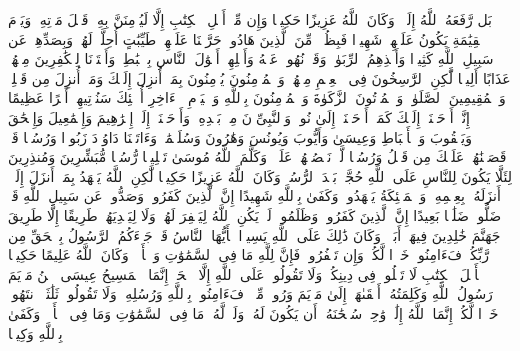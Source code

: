 \startbuffer[\q:4:158]
بَل رَّفَعَهُ ٱللَّهُ إِلَیۡهِۚ وَكَانَ ٱللَّهُ عَزِیزًا حَكِیمࣰا%
\stopbuffer
\startbuffer[\q:4:159]
وَإِن مِّنۡ أَهۡلِ ٱلۡكِتَٰبِ إِلَّا لَیُؤۡمِنَنَّ بِهِۦ قَبۡلَ مَوۡتِهِۦۖ وَیَوۡمَ ٱلۡقِیَٰمَةِ یَكُونُ عَلَیۡهِمۡ شَهِیدࣰا%
\stopbuffer
\startbuffer[\q:4:160]
فَبِظُلۡمࣲ مِّنَ ٱلَّذِینَ هَادُوا۟ حَرَّمۡنَا عَلَیۡهِمۡ طَیِّبَٰتٍ أُحِلَّتۡ لَهُمۡ وَبِصَدِّهِمۡ عَن سَبِیلِ ٱللَّهِ كَثِیرࣰا%
\stopbuffer
\startbuffer[\q:4:161]
وَأَخۡذِهِمُ ٱلرِّبَوٰا۟ وَقَدۡ نُهُوا۟ عَنۡهُ وَأَكۡلِهِمۡ أَمۡوَٰلَ ٱلنَّاسِ بِٱلۡبَٰطِلِۚ وَأَعۡتَدۡنَا لِلۡكَٰفِرِینَ مِنۡهُمۡ عَذَابًا أَلِیمࣰا%
\stopbuffer
\startbuffer[\q:4:162]
لَّٰكِنِ ٱلرَّٰسِخُونَ فِی ٱلۡعِلۡمِ مِنۡهُمۡ وَٱلۡمُؤۡمِنُونَ یُؤۡمِنُونَ بِمَاۤ أُنزِلَ إِلَیۡكَ وَمَاۤ أُنزِلَ مِن قَبۡلِكَۚ وَٱلۡمُقِیمِینَ ٱلصَّلَوٰةَۚ وَٱلۡمُؤۡتُونَ ٱلزَّكَوٰةَ وَٱلۡمُؤۡمِنُونَ بِٱللَّهِ وَٱلۡیَوۡمِ ٱلۡءَاخِرِ أُو۟لَٰۤئِكَ سَنُؤۡتِیهِمۡ أَجۡرًا عَظِیمًا%
\stopbuffer
\startbuffer[\q:4:163]
۞ إِنَّاۤ أَوۡحَیۡنَاۤ إِلَیۡكَ كَمَاۤ أَوۡحَیۡنَاۤ إِلَىٰ نُوحࣲ وَٱلنَّبِیِّۦنَ مِنۢ بَعۡدِهِۦۚ وَأَوۡحَیۡنَاۤ إِلَىٰۤ إِبۡرَٰهِیمَ وَإِسۡمَٰعِیلَ وَإِسۡحَٰقَ وَیَعۡقُوبَ وَٱلۡأَسۡبَاطِ وَعِیسَىٰ وَأَیُّوبَ وَیُونُسَ وَهَٰرُونَ وَسُلَیۡمَٰنَۚ وَءَاتَیۡنَا دَاوُۥدَ زَبُورࣰا%
\stopbuffer
\startbuffer[\q:4:164]
وَرُسُلࣰا قَدۡ قَصَصۡنَٰهُمۡ عَلَیۡكَ مِن قَبۡلُ وَرُسُلࣰا لَّمۡ نَقۡصُصۡهُمۡ عَلَیۡكَۚ وَكَلَّمَ ٱللَّهُ مُوسَىٰ تَكۡلِیمࣰا%
\stopbuffer
\startbuffer[\q:4:165]
رُّسُلࣰا مُّبَشِّرِینَ وَمُنذِرِینَ لِئَلَّا یَكُونَ لِلنَّاسِ عَلَى ٱللَّهِ حُجَّةُۢ بَعۡدَ ٱلرُّسُلِۚ وَكَانَ ٱللَّهُ عَزِیزًا حَكِیمࣰا%
\stopbuffer
\startbuffer[\q:4:166]
لَّٰكِنِ ٱللَّهُ یَشۡهَدُ بِمَاۤ أَنزَلَ إِلَیۡكَۖ أَنزَلَهُۥ بِعِلۡمِهِۦۖ وَٱلۡمَلَٰۤئِكَةُ یَشۡهَدُونَۚ وَكَفَىٰ بِٱللَّهِ شَهِیدًا%
\stopbuffer
\startbuffer[\q:4:167]
إِنَّ ٱلَّذِینَ كَفَرُوا۟ وَصَدُّوا۟ عَن سَبِیلِ ٱللَّهِ قَدۡ ضَلُّوا۟ ضَلَٰلَۢا بَعِیدًا%
\stopbuffer
\startbuffer[\q:4:168]
إِنَّ ٱلَّذِینَ كَفَرُوا۟ وَظَلَمُوا۟ لَمۡ یَكُنِ ٱللَّهُ لِیَغۡفِرَ لَهُمۡ وَلَا لِیَهۡدِیَهُمۡ طَرِیقًا%
\stopbuffer
\startbuffer[\q:4:169]
إِلَّا طَرِیقَ جَهَنَّمَ خَٰلِدِینَ فِیهَاۤ أَبَدࣰاۚ وَكَانَ ذَٰلِكَ عَلَى ٱللَّهِ یَسِیرࣰا%
\stopbuffer
\startbuffer[\q:4:170]
یَٰۤأَیُّهَا ٱلنَّاسُ قَدۡ جَاۤءَكُمُ ٱلرَّسُولُ بِٱلۡحَقِّ مِن رَّبِّكُمۡ فَءَامِنُوا۟ خَیۡرࣰا لَّكُمۡۚ وَإِن تَكۡفُرُوا۟ فَإِنَّ لِلَّهِ مَا فِی ٱلسَّمَٰوَٰتِ وَٱلۡأَرۡضِۚ وَكَانَ ٱللَّهُ عَلِیمًا حَكِیمࣰا%
\stopbuffer
\startbuffer[\q:4:171]
یَٰۤأَهۡلَ ٱلۡكِتَٰبِ لَا تَغۡلُوا۟ فِی دِینِكُمۡ وَلَا تَقُولُوا۟ عَلَى ٱللَّهِ إِلَّا ٱلۡحَقَّۚ إِنَّمَا ٱلۡمَسِیحُ عِیسَى ٱبۡنُ مَرۡیَمَ رَسُولُ ٱللَّهِ وَكَلِمَتُهُۥۤ أَلۡقَىٰهَاۤ إِلَىٰ مَرۡیَمَ وَرُوحࣱ مِّنۡهُۖ فَءَامِنُوا۟ بِٱللَّهِ وَرُسُلِهِۦۖ وَلَا تَقُولُوا۟ ثَلَٰثَةٌۚ ٱنتَهُوا۟ خَیۡرࣰا لَّكُمۡۚ إِنَّمَا ٱللَّهُ إِلَٰهࣱ وَٰحِدࣱۖ سُبۡحَٰنَهُۥۤ أَن یَكُونَ لَهُۥ وَلَدࣱۘ لَّهُۥ مَا فِی ٱلسَّمَٰوَٰتِ وَمَا فِی ٱلۡأَرۡضِۗ وَكَفَىٰ بِٱللَّهِ وَكِیلࣰا%
